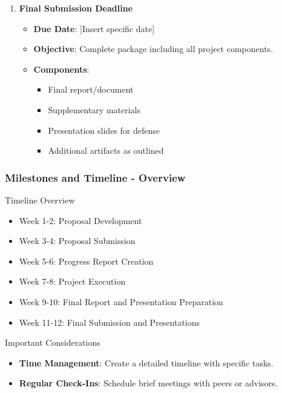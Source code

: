 \documentclass[aspectratio=169]{beamer}
\begin{document}
\begin{frame}[fragile]
\begin{enumerate}
    \item \textbf{Final Submission Deadline}
      \begin{itemize}
        \item \textbf{Due Date}: [Insert specific date]
        \item \textbf{Objective}: Complete package including all project components.
        \item \textbf{Components}:
          \begin{itemize}
            \item Final report/document
            \item Supplementary materials
            \item Presentation slides for defense
            \item Additional artifacts as outlined
          \end{itemize}
      \end{itemize}
  \end{enumerate}
\end{frame}

\begin{frame}[fragile]
  \frametitle{Milestones and Timeline - Overview}
  \begin{block}{Timeline Overview}
    \begin{itemize}
      \item Week 1-2: Proposal Development
      \item Week 3-4: Proposal Submission
      \item Week 5-6: Progress Report Creation
      \item Week 7-8: Project Execution
      \item Week 9-10: Final Report and Presentation Preparation
      \item Week 11-12: Final Submission and Presentations
    \end{itemize}
  \end{block}

  \begin{block}{Important Considerations}
    \begin{itemize}
      \item \textbf{Time Management}: Create a detailed timeline with specific tasks.
      \item \textbf{Regular Check-Ins}: Schedule brief meetings with peers or advisors.
    \end{itemize}
  \end{block}
\end{frame}
\end{document}
